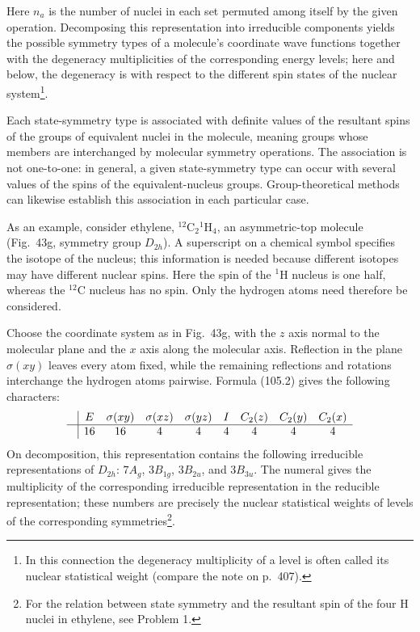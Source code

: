 Here $n_a$ is the number of nuclei in each set permuted among itself by the given operation. Decomposing this representation into irreducible components yields the possible symmetry types of a molecule's coordinate wave functions together with the degeneracy multiplicities of the corresponding energy levels; here and below, the degeneracy is with respect to the different spin states of the nuclear system\footnote{In this connection the degeneracy multiplicity of a level is often called its nuclear statistical weight (compare the note on p.~407).}.

Each state-symmetry type is associated with definite values of the resultant spins of the groups of equivalent nuclei in the molecule, meaning groups whose members are interchanged by molecular symmetry operations. The association is not one-to-one: in general, a given state-symmetry type can occur with several values of the spins of the equivalent-nucleus groups. Group-theoretical methods can likewise establish this association in each particular case.

As an example, consider ethylene, ${}^{12}\mathrm C_2{}^1\mathrm H_4$, an asymmetric-top molecule (Fig.~43g, symmetry group $D_{2h}$). A superscript on a chemical symbol specifies the isotope of the nucleus; this information is needed because different isotopes may have different nuclear spins. Here the spin of the ${}^1\mathrm H$ nucleus is one half, whereas the ${}^{12}\mathrm C$ nucleus has no spin. Only the hydrogen atoms need therefore be considered.

Choose the coordinate system as in Fig.~43g, with the $z$ axis normal to the molecular plane and the $x$ axis along the molecular axis. Reflection in the plane $\sigma(xy)$ leaves every atom fixed, while the remaining reflections and rotations interchange the hydrogen atoms pairwise. Formula (105.2) gives the following characters:
\[
\begin{array}{c|cccccccc}
 &E&\sigma(xy)&\sigma(xz)&\sigma(yz)&I&C_2(z)&C_2(y)&C_2(x)\\ \hline
 &16&16&4&4&4&4&4&4
\end{array}
\]
On decomposition, this representation contains the following irreducible representations of $D_{2h}$: $7A_g$, $3B_{1g}$, $3B_{2u}$, and $3B_{3u}$. The numeral gives the multiplicity of the corresponding irreducible representation in the reducible representation; these numbers are precisely the nuclear statistical weights of levels of the corresponding symmetries\footnote{For the relation between state symmetry and the resultant spin of the four H nuclei in ethylene, see Problem 1.}.

